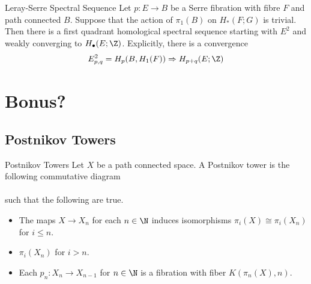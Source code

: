 \documentclass[a4paper]{article}
\begin{document}
\begin{thm}{Leray-Serre Spectral Sequence}{} Let $p:E\to B$ be a Serre fibration with fibre $F$ and path connected $B$. Suppose that the action of $\pi_1(B)$ on $H_\ast(F;G)$ is trivial. Then there is a first quadrant homological spectral sequence starting with $E^2$ and weakly converging to $H_\bullet(E;\Z)$. Explicitly, there is a convergence $$E_{p,q}^2=H_p(B,H_1(F))\Rightarrow H_{p+q}(E;\Z)$$
\end{thm}

\pagebreak
\section{Bonus?}
\subsection{Postnikov Towers}
\begin{defn}{Postnikov Towers}{} Let $X$ be a path connected space. A Postnikov tower is the following commutative diagram \\
\\
such that the following are true. 
\begin{itemize}
\item The maps $X\to X_n$ for each $n\in\N$ induces isomorphisms $\pi_i(X)\cong\pi_i(X_n)$ for $i\leq n$. 
\item $\pi_i(X_n)$ for $i>n$. 
\item Each $p_n:X_n\to X_{n-1}$ for $n\in\N$ is a fibration with fiber $K(\pi_n(X),n)$. 
\end{itemize}
\end{defn}
\end{document}
